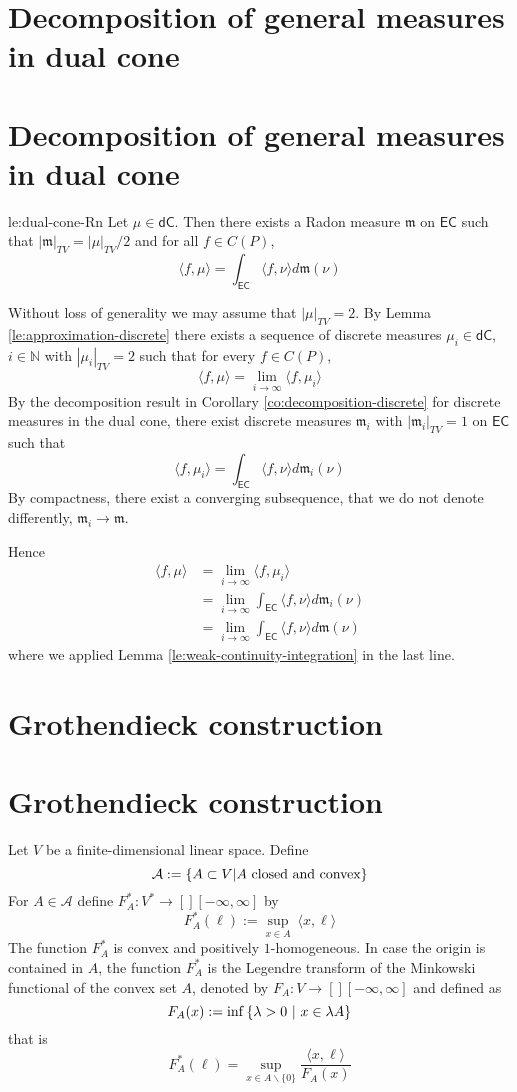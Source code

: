 \documentclass[12pt]{amsart}
\let\Section=\section
\renewcommand{\section}[2][empty]{%
  \xdef\SubsectionName{}%
  \ifthenelse{\equal{#1}{empty}}%
               {\xdef\SectionName{#2}%
                \Section{#2}}%
               {\xdef\SectionName{#1}%
                \Section[#1]{#2}}%
}
\begin{document}
\section{Decomposition of general measures in dual cone}

\begin{proposition}{le:dual-cone-Rn}
Let $\mu \in \mathsf{dC}$. Then there exists a Radon measure $\mathfrak{m}$ on $\mathsf{EC}$ such that $|\mathfrak{m}|_{TV} = |\mu|_{TV}/2$ and for all $f \in C(P)$,
\[
\langle f, \mu \rangle = \int_{\mathsf{EC}} \langle f , \nu \rangle d \mathfrak{m}(\nu)
\]
\end{proposition}

\begin{Proof}
Without loss of generality we may assume that $|\mu|_{TV} = 2$. 
By Lemma \ref{le:approximation-discrete} there exists a sequence of discrete measures $\mu_i \in \mathsf{dC}$, $i \in \mathbb{N}$ with $|\mu_i|_{TV} = 2$ such that for	every $f \in C(P)$,
\[
\langle f , \mu \rangle = \lim_{i \to \infty} \langle f, \mu_i \rangle
\]
By the decomposition result in Corollary \ref{co:decomposition-discrete} for discrete measures in the dual cone, there exist discrete measures $\mathfrak{m}_i$ with $|\mathfrak{m}_i|_{TV} = 1$ on $\mathsf{EC}$ such that
\[
\langle f, \mu_i \rangle = \int_{\mathsf{EC}} \langle f, \nu \rangle d \mathfrak{m}_i(\nu)
\]
By compactness, there exist a converging subsequence, that we do not denote differently, $\mathfrak{m}_i \to \mathfrak{m}$. 

Hence
\[
\begin{split}
\langle f, \mu \rangle
& = \lim_{i \to \infty} \langle f, \mu_i \rangle \\
& = \lim_{i \to \infty} \int_{\mathsf{EC}} \langle f, \nu \rangle d \mathfrak{m}_i(\nu) \\
& = \lim_{i \to \infty} \int_{\mathsf{EC}} \langle f, \nu \rangle d \mathfrak{m}(\nu)
\end{split}
\]
where we applied Lemma \ref{le:weak-continuity-integration} in the last line.
\end{Proof}

\section{Grothendieck construction}

Let $V$ be a finite-dimensional linear space.
Define
\[
\mathcal{A} := \left\{ A \subset V \middle| A \text{ closed and convex} \right\}
\]
For $A \in \mathcal{A}$ define $F_A^*: V^* \to[] [-\infty, \infty]$ by
\[
F_A^*(\ell) := \sup_{x \in A} \ \langle x, \ell \rangle
\]
The function $F_A^*$ is convex and positively $1$-homogeneous.
In case the origin is contained in $A$, the function $F_A^*$ is the Legendre transform of the Minkowski functional of the convex set $A$, denoted by $F_A: V \to[] [-\infty, \infty]$ and defined as
\[
F_A(x) := \inf \left\{ \lambda > 0 \ \middle| \ x \in \lambda A \right\}
\]
that is 
\[
F_A^*(\ell) = \sup_{x \in A \backslash \{ 0 \}} \frac{\langle x, \ell \rangle}{ F_A(x) }
\]
\end{document}
